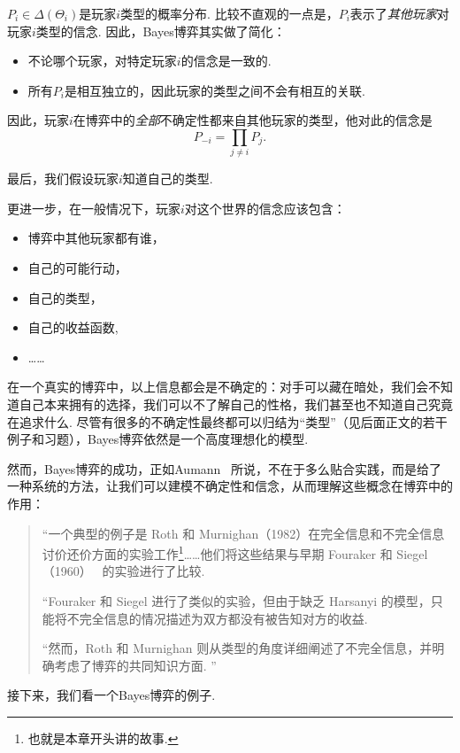 $P_i\in\Delta(\Theta_i)$是玩家$i$类型的概率分布. 比较不直观的一点是，$P_i$表示了\textit{其他玩家}对玩家$i$类型的信念. 因此，Bayes博弈其实做了简化：
\begin{itemize}
    \item 不论哪个玩家，对特定玩家$i$的信念是一致的.
    \item 所有$P_i$是相互独立的，因此玩家的类型之间不会有相互的关联. 
\end{itemize}
因此，玩家$i$在博弈中的\textit{全部}不确定性都来自其他玩家的类型，他对此的信念是
\[P_{-i}=\prod_{j\neq i}P_j.\]

最后，我们假设玩家$i$知道自己的类型.

更进一步，在一般情况下，玩家$i$对这个世界的信念应该包含：
\begin{itemize}
    \item 博弈中其他玩家都有谁，
    \item 自己的可能行动，
    \item 自己的类型，
    \item 自己的收益函数,
    \item ……
\end{itemize}
在一个真实的博弈中，以上信息都会是不确定的：对手可以藏在暗处，我们会不知道自己本来拥有的选择，我们可以不了解自己的性格，我们甚至也不知道自己究竟在追求什么. 尽管有很多的不确定性最终都可以归结为“类型”（见后面正文的若干例子和习题），Bayes博弈依然是一个高度理想化的模型. 

然而，Bayes博弈的成功，正如Aumann~\cite{aumannWhatGameTheory1985} 所说，不在于多么贴合实践，而是给了一种系统的方法，让我们可以建模不确定性和信念，从而理解这些概念在博弈中的作用：
\begin{quotation}
    “一个典型的例子是 Roth 和 Murnighan（1982）在完全信息和不完全信息讨价还价方面的实验工作\footnote{也就是本章开头讲的故事. }……他们将这些结果与早期 Fouraker 和 Siegel（1960）~\cite{siegelBargainingGroupDecision1960} 的实验进行了比较. 

    “Fouraker 和 Siegel 进行了类似的实验，但由于缺乏 Harsanyi 的模型，只能将不完全信息的情况描述为双方都没有被告知对方的收益. 
    
    “然而，Roth 和 Murnighan 则从类型的角度详细阐述了不完全信息，并明确考虑了博弈的共同知识方面. ”
\end{quotation}

接下来，我们看一个Bayes博弈的例子. 

